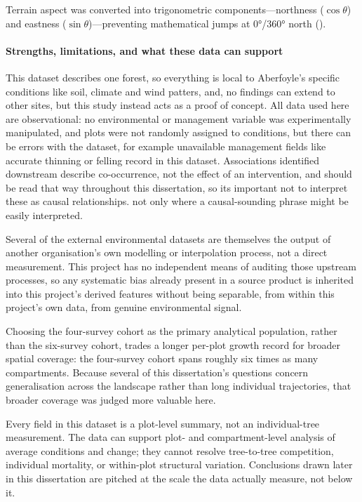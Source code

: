 Terrain aspect was converted into trigonometric components—northness ($\cos\theta$) and eastness ($\sin\theta$)—preventing mathematical jumps at 0°/360° north \cite{moisen2002Comparing_C3_LID} ().


\paragraph{Strengths, limitations, and what these data can support}
\label{sec:data-strengths-limitations}
This dataset describes one forest, so everything is local to Aberfoyle's specific conditions like soil, climate and wind patters, and, no findings can extend to other sites, but this study instead acts as a proof of concept.  
All data used here are observational: no environmental or management variable was experimentally
manipulated, and plots were not randomly assigned to conditions, but there can be errors with the dataset, for example unavailable management fields like accurate thinning or felling record in this dataset. Associations identified downstream describe co-occurrence, not the effect of an intervention, and should be read that way throughout this dissertation, so its important not to interpret these as causal relationships. not only where a causal-sounding phrase might be easily interpreted. 

Several of the external environmental datasets are themselves the output of another organisation's
own modelling or interpolation process, not a direct measurement. This project has no independent
means of auditing those upstream processes, so any systematic bias already present in a source
product is inherited into this project's derived features without being separable, from within
this project's own data, from genuine environmental signal.

Choosing the four-survey cohort as the primary analytical population, rather than the six-survey
cohort, trades a longer per-plot growth record for broader spatial coverage: the four-survey
cohort spans roughly six times as many compartments. Because several of this dissertation's
questions concern generalisation across the landscape rather than long individual trajectories,
that broader coverage was judged more valuable here.

Every field in this dataset is a plot-level summary, not an individual-tree measurement. The data
can support plot- and compartment-level analysis of average conditions and change; they cannot
resolve tree-to-tree competition, individual mortality, or within-plot structural variation.
Conclusions drawn later in this dissertation are pitched at the scale the data actually measure,
not below it. 
